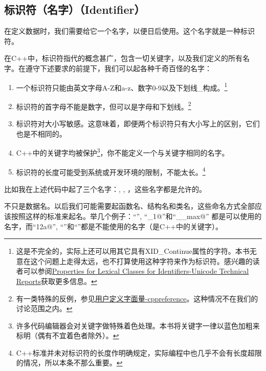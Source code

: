 \subsection*{标识符（名字）（Identifier）}
在定义数据时，我们需要给它一个名字，以便日后使用。这个名字就是一种标识符。\par
在C++中，标识符指代的概念甚广，包含一切关键字，以及我们定义的所有名字。在遵守下述要求的前提下，我们可以起各种千奇百怪的名字：
\begin{enumerate}
    \item 一个标识符只能由英文字母A-Z和a-z、数字0-9以及下划线\_构成。\footnote{这是不完全的，实际上还可以用其它具有XID\_Continue属性的字符。本书无意在这个问题上走得太远，也不打算使用这种字符来作为标识符。感兴趣的读者可以参阅\href{https://www.unicode.org/reports/tr31/\#Table\_Lexical\_Classes\_for\_Identifiers}{Properties for Lexical Classes for Identifiers-Unicode Technical Reports}获取更多信息。}
    \item 标识符的首字母不能是数字，但可以是字母和下划线。\footnote{有一类特殊的反例，参见\href{https://zh.cppreference.com/w/cpp/language/user_literal}{用户定义字面量-cppreference}。这种情况不在我们的讨论范围之内。}
    \item 标识符对大小写敏感。这意味着，即便两个标识符只有大小写上的区别，它们也是不相同的。
    \item C++中的关键字均被保护\footnote{许多代码编辑器会对关键字做特殊着色处理。本书将关键字一律以蓝色加粗来标明（偶有不宜着色者除外）。}，你不能定义一个与关键字相同的名字。
    \item 标识符的长度可能受到系统或开发环境的限制，不能太长。\footnote{C++标准并未对标识符的长度作明确规定，实际编程中也几乎不会有长度超限的情况，所以本条不那么重要。}
\end{enumerate}
比如我在上述代码中起了三个名字：\lstinline@i@, \lstinline@d@, \lstinline@c@，这些名字都是允许的。\par
不只是数据名。以后我们可能需要起函数名、结构名和类名，这些命名方式全部应该按照这样的标准来起名。举几个例子：``\lstinline@lhs@'', ``\lstinline@it_1@''和``\lstinline@__max@'' 都是可以使用的名字，而``\lstinline@12a@'', ``''和``\lstinline@new@''都是不能使用的名字（\lstinline@new@ 是C++中的关键字）。\par
